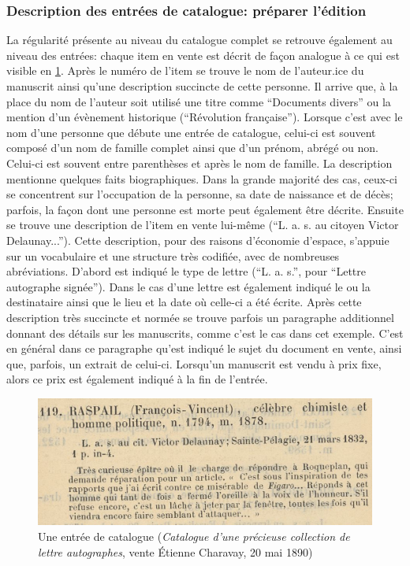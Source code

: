 \subsubsection{Description des entrées de catalogue: préparer l'édition \tei{}}
La régularité présente au niveau du catalogue complet se retrouve également au niveau des entrées: chaque item en vente est décrit de façon analogue à ce qui est visible en \ref{fig:catitem}. Après le numéro de l'item se trouve le nom de l'auteur.ice du manuscrit ainsi qu'une description succincte de cette personne. Il arrive que, à la place du nom de l'auteur soit utilisé une titre comme \enquote{Documents divers} ou la mention d'un évènement historique (\enquote{Révolution française}). Lorsque c'est avec le nom d'une personne que débute une entrée de catalogue, celui-ci est souvent composé d'un nom de famille complet ainsi que d'un prénom, abrégé ou non. Celui-ci est souvent entre parenthèses et après le nom de famille. La description mentionne quelques faits biographiques. Dans la grande majorité des cas, ceux-ci se concentrent sur l'occupation de la personne, sa date de naissance et de décès; parfois, la façon dont une personne est morte peut également être décrite. Ensuite se trouve une description de l'item en vente lui-même (\enquote{L. a. s. au citoyen Victor Delaunay...}). Cette description, pour des raisons d'économie d'espace, s'appuie sur un vocabulaire et une structure très codifiée, avec de nombreuses abréviations. D'abord est indiqué le type de lettre (\enquote{L. a. s.}, pour \enquote{Lettre autographe signée}). Dans le cas d'une lettre est également indiqué le ou la destinataire ainsi que le lieu et la date où celle-ci a été écrite. Après cette description très succincte et normée se trouve parfois un paragraphe additionnel donnant des détails sur les manuscrits, comme c'est le cas dans cet exemple. C'est en général dans ce paragraphe qu'est indiqué le sujet du document en vente, ainsi que, parfois, un extrait de celui-ci. Lorsqu'un manuscrit est vendu à prix fixe, alors ce prix est également indiqué à la fin de l'entrée.

\begin{figure}[h]
	\centering
	\includegraphics[width=\textwidth]{img/CAT_000441_e119}
	\caption{Une entrée de catalogue (\textit{Catalogue d'une précieuse collection de lettre autographes}, vente Étienne Charavay, 20 mai 1890)}
	\label{fig:catitem}
\end{figure}

